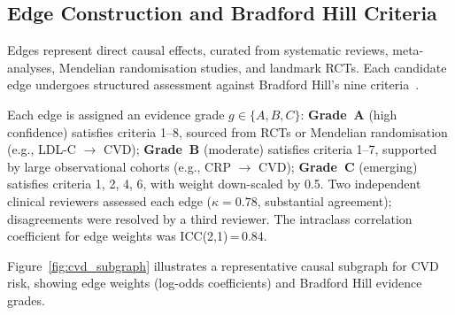 \documentclass[runningheads]{llncs}
\begin{document}
\subsection{Edge Construction and Bradford Hill Criteria}
\label{sec:edges}

Edges represent direct causal effects, curated from systematic
reviews, meta-analyses, Mendelian randomisation studies, and landmark
RCTs.  Each candidate edge undergoes structured assessment against
Bradford Hill's nine criteria~\cite{hill1965environment}.

Each edge is assigned an evidence grade $g \in \{A, B, C\}$:
\textbf{Grade~A} (high confidence) satisfies criteria 1--8, sourced
from RCTs or Mendelian randomisation (e.g., LDL-C $\rightarrow$ CVD);
\textbf{Grade~B} (moderate) satisfies criteria 1--7, supported by
large observational cohorts (e.g., CRP $\rightarrow$ CVD);
\textbf{Grade~C} (emerging) satisfies criteria 1, 2, 4, 6, with
weight down-scaled by 0.5.  Two independent clinical reviewers
assessed each edge ($\kappa = 0.78$, substantial agreement);
disagreements were resolved by a third reviewer.  The intraclass
correlation coefficient for edge weights was ICC(2,1)\,=\,0.84.

Figure~\ref{fig:cvd_subgraph} illustrates a representative causal
subgraph for CVD risk, showing edge weights (log-odds coefficients)
and Bradford Hill evidence grades.
\end{document}

